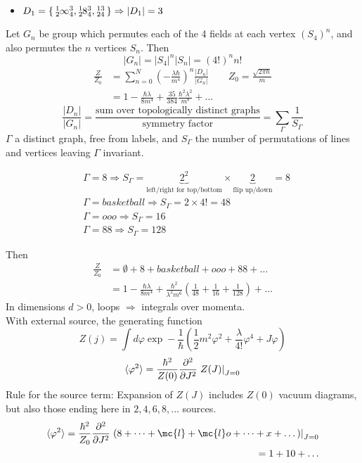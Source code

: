 \documentclass{article}
\begin{document}
\begin{itemize}
    \item $D_1 = \set{\tensor*[^1_2]{\infty}{^3_4},\tensor*[^1_2]{8}{^3_4}, \tensor*[^1_2]{}{^3_4} } \Rightarrow |D_1| = 3$
\end{itemize}
Let $G_n$ be group which permutes each of the 4 fields at each vertex $(S_4)^n$, and also permutes the $n$ vertices $S_n$. Then 
\[
|G_n| = |S_4|^n |S_n| = (4!)^n n!
\]
\begin{align*}
\frac{Z}{Z_0} &= \sum_{n=0}^N \left(-\frac{\lambda\hbar}{m^4} \right)^n \frac{|D_n|}{|G_n|} \qquad Z_0 =\frac{\sqrt{2\pi\hbar}}{m} \\
&= 1 - \frac{\hbar\lambda}{8m^4} + \frac{35}{384}\frac{\hbar^2 \lambda^2}{m^8}+\dots
\end{align*}
\[
\frac{|D_n|}{|G_n|} = \frac{\text{sum over topologically distinct graphs}}{\text{symmetry factor}} = \sum_{\Gamma} \frac{1}{S_\Gamma}
\]
$\Gamma$ a distinct graph, free from labels, and $S_\Gamma$ the number of permutations of lines and vertices leaving $\Gamma$ invariant. 

\begin{example}
\begin{align*}
&\Gamma = 8 \Rightarrow S_\Gamma = \underbrace{2^2}_{\text{left/right for top/bottom}} \times \underbrace{2}_{\text{flip up/down}}=8 \\
&\Gamma = basketball \Rightarrow S_\Gamma = 2 \times 4! = 48 \\
&\Gamma = ooo \Rightarrow S_\Gamma = 16 \\
&\Gamma = 8 8 \Rightarrow S_\Gamma = 128
\end{align*}
\end{example}
Then 
\begin{align*}
    \frac{Z}{Z_0} &= \emptyset + 8 + basketball + ooo + 8 8 + \dots \\
    &= 1 - \frac{\hbar\lambda}{8m^4} + \frac{\hbar^2}{\lambda^2 m^6} \left( \frac{1}{48} + \frac{1}{16} + \frac{1}{128} \right) + \dots 
\end{align*}
In dimensions $d>0$, loops $\Rightarrow$ integrals over momenta. \\
With external source, the generating function 
\[
Z(j) = \int d\varphi \exp -\frac{1}{\hbar} \left( \frac{1}{2}m^2 \varphi^2 + \frac{\lambda}{4!}\varphi^4 + J\varphi \right) 
\]
\[
\braket{\varphi^2} = \frac{\hbar^2}{Z(0)} \frac{\partial^2 }{\partial J^2} \left. Z(J) \right \rvert_{J=0}
\]
Rule for the source term: Expansion of $Z(J)$ includes $Z(0)$ vacuum diagrams, but also those ending here in $2,4,6,8,\dots$ sources. 
\begin{align*}
\braket{\varphi^2} = \frac{\hbar^2}{Z_0} \pds{J} \left.\left( 8 + \dots + \mc{l} + \mc{l}o +\dots +x+\dots \right)\right\rvert_{J=0} \\
= 1 + 10 + \dots 
\end{align*}
\end{document}

